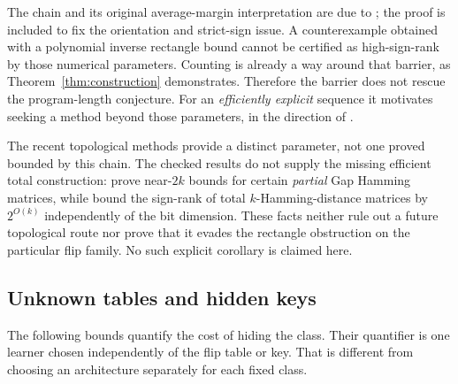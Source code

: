 \documentclass[11pt]{article}
\newcommand{\1}{\mathbf 1}
\begin{document}
The chain and its original average-margin interpretation are due to \citet{HHPTZ22}; the proof is included to fix the orientation and strict-sign issue. A counterexample obtained with a polynomial inverse rectangle bound cannot be certified as high-sign-rank by those numerical parameters. Counting is already a way around that barrier, as Theorem~\ref{thm:construction} demonstrates. Therefore the barrier does not rescue the program-length conjecture. For an \emph{efficiently explicit} sequence it motivates seeking a method beyond those parameters, in the direction of \citet[Problem~4.1]{HHPTZ22}.

The recent topological methods provide a distinct parameter, not one proved bounded by this chain. The checked results do not supply the missing efficient total construction: \citet{FHV26} prove near-$2k$ bounds for certain \emph{partial} Gap Hamming matrices, while \citet{GHIS25} bound the sign-rank of total $k$-Hamming-distance matrices by $2^{O(k)}$ independently of the bit dimension. These facts neither rule out a future topological route nor prove that it evades the rectangle obstruction on the particular flip family. No such explicit corollary is claimed here.


\subsection{Unknown tables and hidden keys}\label{sec:secret}
The following bounds quantify the cost of hiding the class. Their quantifier is one learner chosen independently of the flip table or key. That is different from choosing an architecture separately for each fixed class.
\end{document}
